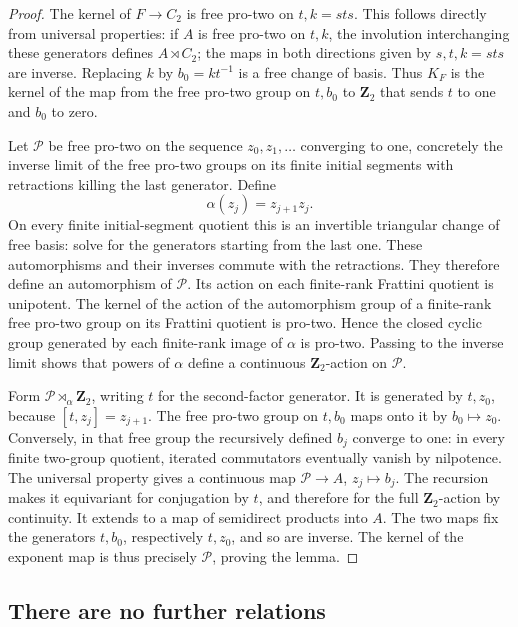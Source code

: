 \begin{proof}
The kernel of \(F\to C_2\) is free pro-two on
\(t,k=sts\). This follows directly from universal properties:
if \(A\) is free pro-two on \(t,k\), the involution interchanging
these generators defines \(A\rtimes C_2\); the maps in both
directions given by \(s,t,k=sts\) are inverse.
Replacing \(k\) by \(b_0=kt^{-1}\) is a free change of basis.
Thus \(K_F\) is the kernel of the map from the free pro-two
group on \(t,b_0\) to \(\mathbf Z_2\) that sends \(t\) to one
and \(b_0\) to zero.

Let \(\mathcal P\) be free pro-two on the sequence
\(z_0,z_1,\ldots\) converging to one, concretely the inverse
limit of the free pro-two groups on its finite initial segments
with retractions killing the last generator. Define
\[
                   \alpha(z_j)=z_{j+1}z_j.
\]
On every finite initial-segment quotient this is an invertible
triangular change of free basis: solve for the generators
starting from the last one. These automorphisms and their
inverses commute with the retractions. They therefore define
an automorphism of \(\mathcal P\).
Its action on each finite-rank Frattini quotient is unipotent.
The kernel of the action of the automorphism group of a
finite-rank free pro-two group on its Frattini quotient is
pro-two. Hence the closed cyclic group generated by each
finite-rank image of \(\alpha\) is pro-two. Passing to the
inverse limit shows that powers of \(\alpha\) define a
continuous \(\mathbf Z_2\)-action on \(\mathcal P\).

Form \(\mathcal P\rtimes_\alpha\mathbf Z_2\), writing \(t\)
for the second-factor generator. It is generated by \(t,z_0\),
because \([t,z_j]=z_{j+1}\). The free pro-two group on
\(t,b_0\) maps onto it by \(b_0\mapsto z_0\).
Conversely, in that free group the recursively defined
\(b_j\) converge to one: in every finite two-group quotient,
iterated commutators eventually vanish by nilpotence.
The universal property gives a continuous map
\(\mathcal P\to A\), \(z_j\mapsto b_j\).
The recursion makes it equivariant for conjugation by \(t\),
and therefore for the full \(\mathbf Z_2\)-action by continuity.
It extends to a map of semidirect products into \(A\).
The two maps fix the generators \(t,b_0\), respectively
\(t,z_0\), and so are inverse.
The kernel of the exponent map is thus precisely
\(\mathcal P\), proving the lemma.
\end{proof}

\subsection{There are no further relations}

